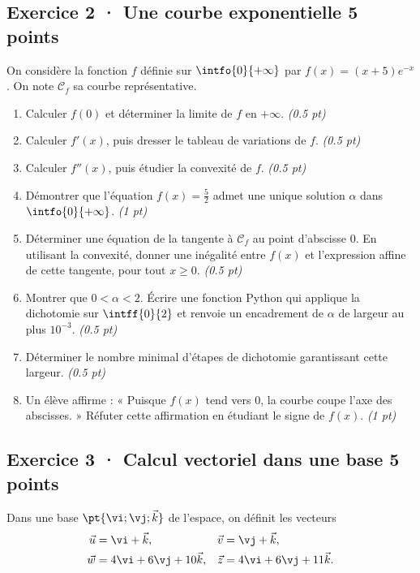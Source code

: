 \subsection*{Exercice 2 · Une courbe exponentielle \hfill 5 points}On considère la fonction $f$ définie sur $\intfo{0}{+\infty}$ par $f(x)=(x+5)e^{-x}$. On note $\mathcal C_f$ sa courbe représentative.

\begin{enumerate}

\item Calculer $f(0)$ et déterminer la limite de $f$ en $+\infty$. \hfill\textit{(\num{0,5} pt)}

\item Calculer $f' (x)$, puis dresser le tableau de variations de $f$. \hfill\textit{(\num{0,5} pt)}

\item Calculer $f'' (x)$, puis étudier la convexité de $f$. \hfill\textit{(\num{0,5} pt)}

\item Démontrer que l'équation $f(x)=\frac{5}{2}$ admet une unique solution $\alpha$ dans $\intfo{0}{+\infty}$. \hfill\textit{(1 pt)}

\item Déterminer une équation de la tangente à $\mathcal C_f$ au point d'abscisse $0$. En utilisant la convexité, donner une inégalité entre $f(x)$ et l'expression affine de cette tangente, pour tout $x\ge0$. \hfill\textit{(\num{0,5} pt)}

\item Montrer que $0<\alpha<2$. Écrire une fonction Python qui applique la dichotomie sur $\intff{0}{2}$ et renvoie un encadrement de $\alpha$ de largeur au plus $10^{-3}$. \hfill\textit{(\num{0,5} pt)}

\item Déterminer le nombre minimal d'étapes de dichotomie garantissant cette largeur. \hfill\textit{(\num{0,5} pt)}

\item Un élève affirme : « Puisque $f(x)$ tend vers $0$, la courbe coupe l'axe des abscisses. » Réfuter cette affirmation en étudiant le signe de $f(x)$. \hfill\textit{(1 pt)}

\end{enumerate}

\mxnewpage{}

\subsection*{Exercice 3 · Calcul vectoriel dans une base \hfill 5 points}Dans une base $\pt{\vi;\vj;\vec k}$ de l'espace, on définit les vecteurs
\[\begin{aligned}\vec u&=\vi+\vec k,&\vec v&=\vj+\vec k,\\
\vec w&=4\vi+6\vj+10\vec k,&\vec z&=4\vi+6\vj+11\vec k.\end{aligned}\]


